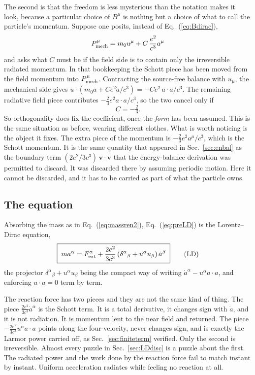 \documentclass[preprint]{aastex701}
\newcommand{\Fext}{F^\alpha_{\rm ext}}
\begin{document}
The second is that the freedom is less mysterious than the notation makes it
look, because a particular choice of $B^\mu$ is nothing but a choice of what to
call the particle's momentum. Suppose one posits, instead of
Eq.~(\ref{eq:Bdirac}),
\begin{equation}
P_{\rm mech}^\mu = m_0 u^\mu + C\,\frac{e^2}{c^3}a^\mu
\label{eq:PmechC}
\end{equation}
and asks what $C$ must be if the field side is to contain only the irreversible
radiated momentum. In that bookkeeping the Schott piece has been moved from the
field momentum into $P_{\rm mech}^\mu$. Contracting the source-free balance with
$u_\mu$, the mechanical side gives
$u\cdot(m_0 a + Ce^2\dot a/c^3) = -Ce^2\,a\cdot a/c^3$. The remaining radiative
field piece contributes $-\tfrac23 e^2 a\cdot a/c^3$, so the two cancel only if
\begin{equation}
C = -\tfrac23 .
\label{eq:Cvalue}
\end{equation}
So orthogonality does fix the coefficient, once the \emph{form} has been assumed.
This is the same situation as before, wearing different clothes. What is
worth noticing is the object it fixes. The extra piece of the momentum is
$-\tfrac23 e^2 a^\mu/c^3$, which is the Schott momentum. It is the same quantity that
appeared in Sec.~\ref{sec:enbal} as the boundary term
$(2e^2/3c^3)\,\dot{\mathbf v}\cdot\mathbf v$ that the energy-balance derivation
was permitted to discard. It was discarded there by assuming periodic motion.
Here it cannot be discarded, and it has to be carried as part of what the
particle owns.

\subsection{The equation}
\label{sec:LDeq}

Absorbing the mass as in Eq.~(\ref{eq:massren2}), Eq.~(\ref{eq:preLD}) is the
Lorentz--Dirac equation,
\begin{equation}
\boxed{\;ma^\alpha = \Fext + \frac{2e^2}{3c^3}
\left(\delta^\alpha{}_\beta + u^\alpha u_\beta\right)\dot a^\beta\;}
\tag{LD}
\label{eq:LD}
\end{equation}
the projector $\delta^\alpha{}_\beta + u^\alpha u_\beta$ being the compact way of
writing $\dot a^\alpha - u^\alpha a\cdot a$, and enforcing $u\cdot a = 0$ term by
term.

The reaction force has two pieces and they are not the same kind of thing. The
piece $\tfrac{2e^2}{3c^3}\dot a^\alpha$ is the Schott term. It is a total
derivative, it changes sign with $\dot a$, and it is not radiation. It is
momentum lent to the near field and returned. The piece
$-\tfrac{2e^2}{3c^3}u^\alpha a\cdot a$ points along the four-velocity, never
changes sign, and is exactly the Larmor power carried off, as
Sec.~\ref{sec:finiteterm} verified. Only the second is irreversible. Almost
every puzzle in Sec.~\ref{sec:LDdisc} is a puzzle about the first. The radiated
power and the work done by the reaction force fail to match instant by instant.
Uniform acceleration radiates while feeling no reaction at all.
\end{document}
